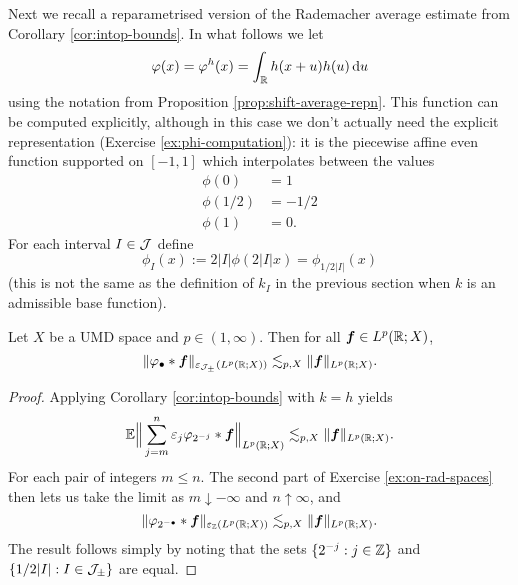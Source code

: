 Next we recall a reparametrised version of the Rademacher average estimate from Corollary \ref{cor:intop-bounds}.
In what follows we let
\begin{equation*}
  \varphi(x) = \varphi^{h}(x) = \int_{\mathbb{R}} h(x+u) h(u) \, \mathrm{d} u
\end{equation*}
using the notation from Proposition \ref{prop:shift-average-repn}.
This function can be computed explicitly, although in this case we don't actually need the explicit representation (Exercise \ref{ex:phi-computation}): it is the piecewise affine even function supported on $[-1,1]$ which interpolates between the values
\begin{equation}\label{eq:phi-2}
  \begin{aligned}
    \phi(0) &= 1 \\ 
    \phi(1/2) &= -1/2 \\
    \phi(1) &= 0.
  \end{aligned}
\end{equation}
For each interval $I \in \mathcal{J}$ define
\begin{equation*}
  \phi_{I}(x) := 2|I|\phi(2|I|x) = \phi_{1/2|I|}(x)
\end{equation*}
(this is not the same as the definition of $k_{I}$ in the previous section when $k$ is an admissible base function).

\begin{lem}\label{lem:reparam-LP}
  Let $X$ be a UMD space and $p \in (1,\infty)$.
  Then for all $\bm{f} \in L^p(\mathbb{R};X)$,
  \begin{equation*}
    \| \varphi_{\bullet} \ast \bm{f} \|_{\varepsilon_{\mathcal{J}_{\pm}}(L^p(\mathbb{R};X))} \lesssim_{p,X} \|\bm{f}\|_{L^p(\mathbb{R};X)}.
  \end{equation*}
\end{lem}

\begin{proof}
  Applying Corollary \ref{cor:intop-bounds} with $k = h$ yields
  \begin{equation*}
    \mathbb{E} \Big\| \sum_{j = m}^{n} \varepsilon_{j} \varphi_{2^{-j}} \ast \bm{f} \Big\|_{L^p(\mathbb{R};X)} \lesssim_{p,X} \|\bm{f}\|_{L^p(\mathbb{R};X)}.
  \end{equation*}
  For each pair of integers $m \leq n$.
  The second part of Exercise \ref{ex:on-rad-spaces} then lets us take the limit as $m \downarrow -\infty$ and $n \uparrow \infty$, and
  \begin{equation*}
    \| \varphi_{2^{-\bullet}} \ast \bm{f} \|_{\varepsilon_{\mathbb{Z}}(L^p(\mathbb{R};X))} \lesssim_{p,X} \|\bm{f}\|_{L^p(\mathbb{R};X)}.
\end{equation*}
The result follows simply by noting that the sets $\{2^{-j} : j \in \mathbb{Z}\}$ and $\{1/2|I| : I \in \mathcal{J}_{\pm}\}$ are equal.
\end{proof}


